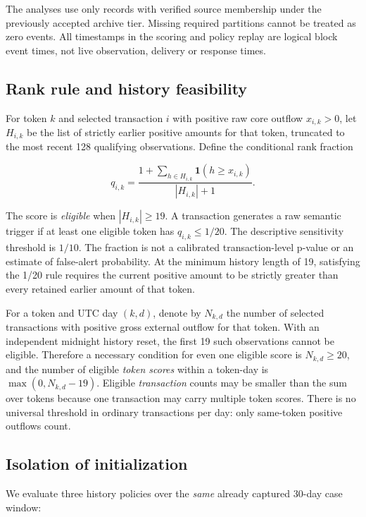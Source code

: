 \documentclass[preprint,12pt,authoryear]{elsarticle}
\begin{document}
The analyses use only records with verified source membership under the previously accepted archive tier. Missing required partitions cannot be treated as zero events. All timestamps in the scoring and policy replay are logical block event times, not live observation, delivery or response times.

\subsection{Rank rule and history feasibility}\label{rank-rule-and-history-feasibility}

For token \(k\) and selected transaction \(i\) with positive raw core outflow \(x_{i,k}>0\), let \(H_{i,k}\) be the list of strictly earlier positive amounts for that token, truncated to the most recent 128 qualifying observations. Define the conditional rank fraction

\[
q_{i,k}=\frac{1+\sum_{h\in H_{i,k}}\mathbf{1}(h\ge x_{i,k})}{|H_{i,k}|+1}.
\]

The score is \emph{eligible} when \(|H_{i,k}|\ge 19\). A transaction generates a raw semantic trigger if at least one eligible token has \(q_{i,k}\le 1/20\). The descriptive sensitivity threshold is \(1/10\). The fraction is not a calibrated transaction-level p-value or an estimate of false-alert probability. At the minimum history length of 19, satisfying the 1/20 rule requires the current positive amount to be strictly greater than every retained earlier amount of that token.

For a token and UTC day \((k,d)\), denote by \(N_{k,d}\) the number of selected transactions with positive gross external outflow for that token. With an independent midnight history reset, the first 19 such observations cannot be eligible. Therefore a necessary condition for even one eligible score is \(N_{k,d}\ge 20\), and the number of eligible \emph{token scores} within a token-day is \(\max(0,N_{k,d}-19)\). Eligible \emph{transaction} counts may be smaller than the sum over tokens because one transaction may carry multiple token scores. There is no universal threshold in ordinary transactions per day: only same-token positive outflows count.

\subsection{Isolation of initialization}\label{isolation-of-initialization}

We evaluate three history policies over the \emph{same} already captured 30-day case window:
\end{document}
